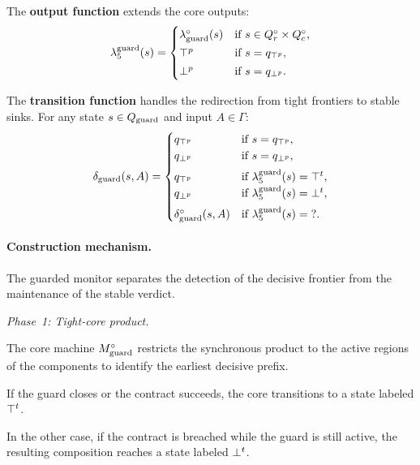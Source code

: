 \begin{definition}
      The \textbf{output function} extends the core outputs:
      \[
      \lambda_5^{\text{guard}}(s)=
      \begin{cases}
      \lambda_{\text{guard}}^{\circ}(s) & \text{if } s\in Q_r^{\circ}\times Q_c^{\circ},\\[2pt]
      \top^p & \text{if } s=q_{\top^p},\\[2pt]
      \bot^p & \text{if } s=q_{\bot^p}.
      \end{cases}
      \]
      
      The \textbf{transition function} handles the redirection from tight frontiers to stable sinks.
      For any state $s \in Q_{\text{guard}}$ and input $A \in \Gamma$:
      \[
      \delta_{\text{guard}}(s,A)=
      \begin{cases}
      q_{\top^p} & \text{if } s=q_{\top^p},\\
      q_{\bot^p} & \text{if } s=q_{\bot^p},\\[4pt]
      
      q_{\top^p} & \text{if }  \lambda_5^{\text{guard}}(s)=\top^t,\\
      q_{\bot^p} & \text{if }  \lambda_5^{\text{guard}}(s)=\bot^t,\\[4pt]
      
      \delta_{\text{guard}}^{\circ}(s,A) & \text{if }\lambda_5^{\text{guard}}(s)=\mathsf{?}.
      \end{cases}
      \]
      \end{definition}
      
 \paragraph{Construction mechanism.}

      The guarded monitor separates the detection of the decisive frontier from the maintenance of the stable verdict.

      

      \smallskip

      \noindent\emph{Phase~1: Tight-core product.}

      The core machine $M_{\text{guard}}^{\circ}$ restricts the synchronous product to the active regions of the components to identify the earliest decisive prefix.

      If the guard closes or the contract succeeds, the core transitions to a state labeled $\top^t$.

   In the other case, if the contract is breached while the guard is still active, the resulting composition reaches a state labeled $\bot^t$.

